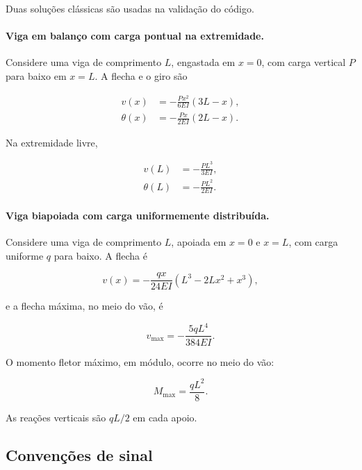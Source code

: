 \documentclass[12pt,a4paper]{article}
\begin{document}
Duas soluções clássicas são usadas na validação do código.

\paragraph{Viga em balanço com carga pontual na extremidade.}
Considere uma viga de comprimento \(L\), engastada em \(x=0\), com carga vertical \(P\) para baixo em \(x=L\). A flecha e o giro são

\begin{align}
  v(x) &= -\frac{P x^2}{6EI}(3L-x), \label{eq:cant_v}\\
  \theta(x) &= -\frac{P x}{2EI}(2L-x). \label{eq:cant_theta}
\end{align}

Na extremidade livre,

\begin{align}
  v(L) &= -\frac{PL^3}{3EI}, \label{eq:cant_vL}\\
  \theta(L) &= -\frac{PL^2}{2EI}. \label{eq:cant_thetaL}
\end{align}

\paragraph{Viga biapoiada com carga uniformemente distribuída.}
Considere uma viga de comprimento \(L\), apoiada em \(x=0\) e \(x=L\), com carga uniforme \(q\) para baixo. A flecha é

\begin{equation}
  v(x) = -\frac{q x}{24EI}\left(L^3 - 2Lx^2 + x^3\right),
  \label{eq:ss_udl_v}
\end{equation}

e a flecha máxima, no meio do vão, é

\begin{equation}
  v_{\max} = -\frac{5qL^4}{384EI}.
  \label{eq:ss_udl_vmax}
\end{equation}

O momento fletor máximo, em módulo, ocorre no meio do vão:

\begin{equation}
  M_{\max} = \frac{qL^2}{8}.
  \label{eq:ss_udl_Mmax}
\end{equation}

As reações verticais são \(qL/2\) em cada apoio.

\subsection{Convenções de sinal}
\label{sec:sinais}
\end{document}

